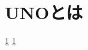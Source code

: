 \documentclass[11pt]{ltjsarticle}
\begin{document}
\section{UNOとは}
\label{ゲーム準備}
\label{ゲーム}


\ref{ゲーム準備}
\ref{ゲーム準備}
\end{document}
